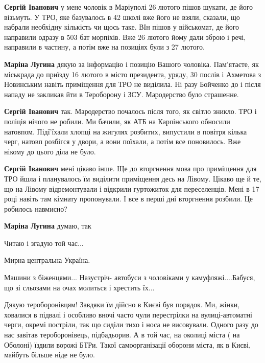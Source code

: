 \begin{itemize}
\textbf{Сергій Іванович} у мене чоловік в Маріуполі 26 лютого пішов шукати, де його візьмуть. У ТРО, яке базувалось в 42 школі вже його не взяли, сказали, що набрали необхідну кількість чи щось таке. ВІн пішов у військомат, де його направили одразу в 503 бат морпіхів. Вже 26 лютого йому дали зброю і речі, направили в частину, а потім вже на позиціях були з 27 лютого.

\textbf{Маріна Лугина} дякую за інформацію і позицію Вашого чоловіка. Пам'ятаєте, як міськрада до приїзду 16 лютого в місто президента, уряду, 30 послів і Ахметова з Новинським навіть приміщення для ТРО не виділила. Ні разу Бойченко до і після нападу не закликав йти в Тероборону і ЗСУ. Мародерство було страшенне.

\textbf{Сергій Іванович} так. Мародерство почалось після того, як світло зникло. ТРО і поліція нічого не робили. Ми бачили, як АТБ на Карпінського обносили натовпом. Підї'їхали хлопці на жигулях розбитих, випустили в повітря кілька черг, натовп розбігся у двори, а вони поїхали, а потім все поновилось. Вже нікому до цього діла не було.

\textbf{Сергій Іванович} мені цікаво інше. Ще до вторгнення мова про приміщення для ТРО йшла і планувалось їм виділити приміщення десь на Лівому. Цікаво ще й те, що на Лівому відремонтували і відкрили гуртожиток для переселенців. Мені в 17 році навіть там кімнату пропонували. І все в перші дні вторгнення розбили. Це робилось навмисно?


\textbf{Маріна Лугина} думаю, так

\end{itemize} %


Читаю і згадую той час...

Мирна центральна Україна.

Машини з біженцями... Назустріч- автобуси з чоловіками у камуфляжі....Бабуся,
що зі сльозами на очах молиться і хрестить їх...


Дякую тероборонівцям! Завдяки їм дійсно в Києві був порядок. Ми, жінки,
ховалися в підвалі і особливо вночі часто чули перестрілки на вулиці-автоматні
черги, окремі постріли, так що сиділи тихо і носа не висовували. Одного разу до
нас завітав тероборонівець, підбадьорив. А в той час, на околиці міста ( на
Оболоні) їздили ворожі БТРи. Такої самоорганізації оборони міста, як в Києві,
майбуть більше ніде не було.

